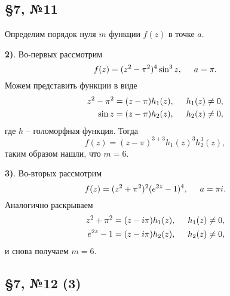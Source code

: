 \subsection*{\S7, №11}

Определим порядок нуля $m$ функции $f(z)$ в точке $a$.

\textbf{2)}. Во-первых рассмотрим
\begin{equation*}
    f(z) = (z^2 - \pi^2)^4 \sin^3 z, \hspace{5 mm} 
    a = \pi.
\end{equation*}
Можем представить функции в виде
\begin{align*}
    z^2 - \pi^2 &= (z-\pi) h_1 (z), \hspace{5 mm} h_1 (z) \neq 0, \\
    \sin z &= (z-\pi) h_2 (z), \hspace{5 mm} h_2 (z) \neq 0,
\end{align*}
где $h$ -- голоморфная функция. Тогда
\begin{equation*}
    f(z) = (z-\pi)^{3+3} h_1(z)^3 h_2^3(z),
\end{equation*}
таким образом нашли, что $m=6$.



\textbf{3)}. Во-вторых рассмотрим
\begin{equation*}
    f(z) = (z^2 + \pi^2)^2 (e^{2z} -1)^4, \hspace{5 mm} 
    a = \pi i.
\end{equation*}
Аналогично раскрываем
\begin{align*}
    z^2 + \pi^2 &= (z-i\pi) h_1 (z), \hspace{5 mm} h_1 (z) \neq 0, \\
    e^{2z}-1 &= (z - i \pi) h_2 (z), \hspace{5 mm} h_2 (z) \neq 0,
\end{align*}
и снова получаем $m=6$.





\subsection*{\S7, №12 (3)}

